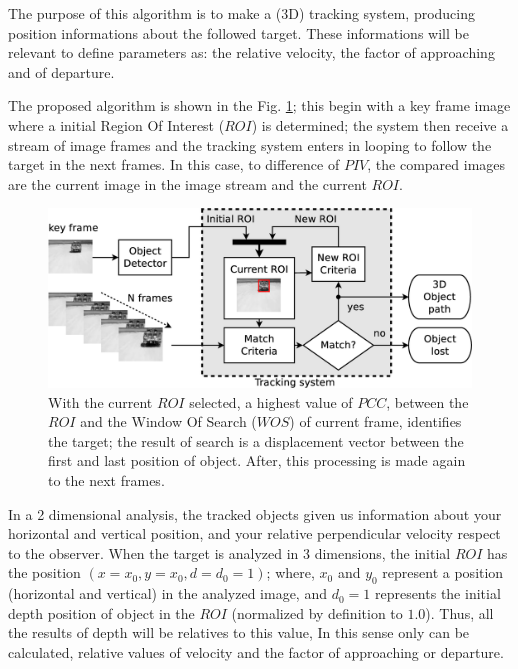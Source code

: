 The purpose of this algorithm is to make a (3D) tracking system, producing position informations 
about the followed target.
These informations will be relevant to define parameters 
as: the relative velocity, the factor of approaching and of departure.

The proposed algorithm is shown in the Fig. \ref{fig:system};
this begin with a key frame image where a initial Region Of Interest ($ROI$) is determined; 
the system then receive a stream of image frames and the tracking system 
enters in looping to follow the target in the next frames.
In this case, to difference of $PIV$, the compared images are 
the current image in the image stream and the current $ROI$.

\begin{figure}[bhp]
\includegraphics[width=\columnwidth]{images/figure1-diagram1.eps}
\caption{With the current $ROI$ selected, a highest value of $PCC$, between the $ROI$ 
and the Window Of Search ($WOS$) of current frame, identifies the target; 
the result of search is a displacement vector
between the first and last position of object. 
After, this processing is made again to the next frames.}
\label{fig:system}
\end{figure}

In a 2 dimensional analysis, the tracked objects given us information about your horizontal 
and vertical position, and your relative perpendicular velocity respect to the observer.
When the target is analyzed in 3 dimensions, 
the initial $ROI$ has the position $(x=x_0,y=x_0,d=d_0=1)$;
where, $x_0$ and $y_0$ represent a position (horizontal and vertical) in the analyzed image,
and $d_0=1$ represents the initial depth position of object in the $ROI$ (normalized by definition to $1.0$).
Thus, all the results of depth will be relatives to this value, 
In this sense only can be calculated, relative values of
velocity and the factor of approaching or departure. 

